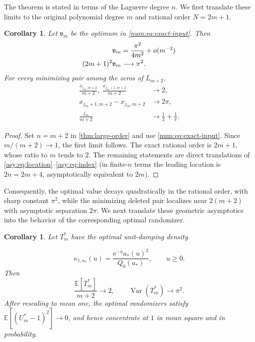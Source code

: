\documentclass[11pt]{article}
\numberwithin{equation}{section}
\newtheorem{corollary}[theorem]{Corollary}
\theoremstyle{definition}
\theoremstyle{remark}
\newcommand{\E}{\mathbb E}
\newcommand{\Var}{\operatorname{Var}}
\newcommand{\Lag}{L}
\newcommand{\e}{\mathrm e}
\begin{document}
The theorem is stated in terms of the Laguerre degree $n$. We first translate these limits to the original polynomial degree $m$ and rational order $N=2m+1$.

\begin{corollary}\label{asy:cor:m}
Let $\mathfrak v_m$ be the optimum in
\eqref{num:eq:exact-input}. Then
\begin{align}
 \mathfrak v_m
 &=
 \frac{\pi^2}{4m^2}+o(m^{-2})\notag\\
 \label{eq:conv_spacing}
 (2m+1)^2\mathfrak v_m
 &\longrightarrow\pi^2.
\end{align}
For every minimizing pair among the zeros of $\Lag_{m+2}$,
\begin{align*}
 \frac{x_{j_m,m+2}}{m+2},\
 \frac{x_{j_m+1,m+2}}{m+2}
 &\longrightarrow2,\\
 x_{j_m+1,m+2}-x_{j_m,m+2}
 &\longrightarrow2\pi,\\
 \frac{j_m}{m+2}
 &\longrightarrow\frac12+\frac1\pi.
\end{align*}
\end{corollary}

\begin{proof}
Set $n=m+2$ in \cref{thm:large-order} and use
\eqref{num:eq:exact-input}. Since $m/(m+2)\to1$, the first limit follows.
The exact rational order is $2m+1$, whose ratio to $m$ tends to $2$.
The remaining statements are direct translations of
\eqref{asy:eq:location}--\eqref{asy:eq:index} (in finite-$n$ terms the
leading location is $2n=2m+4$, asymptotically equivalent to $2m$).
\end{proof}

Consequently, the optimal value decays quadratically in the rational order, with sharp constant $\pi^2$, while the minimizing deleted pair localizes near $2(m+2)$ with asymptotic separation $2\pi$. We next translate these geometric asymptotics into the behavior of the corresponding optimal randomizer.

\begin{corollary}\label{asy:cor:moments}
Let $T_m^*$ have the optimal unit-damping density

\[
\kappa_{1,a_*}(u)
=
\frac{\e^{-u}a_*(u)^2}{Q_0(a_*)},
\qquad u\ge0.
\]
Then
\[
 \frac{\E[T_m^*]}{m+2}\longrightarrow2,
 \qquad
 \Var(T_m^*)\longrightarrow\pi^2.
\]
After rescaling to mean one, the optimal randomizers satisfy $\E[(U_m^*-1)^2]\longrightarrow0$, and hence concentrate at $1$ in mean square and in probability.
\end{corollary}
\end{document}
